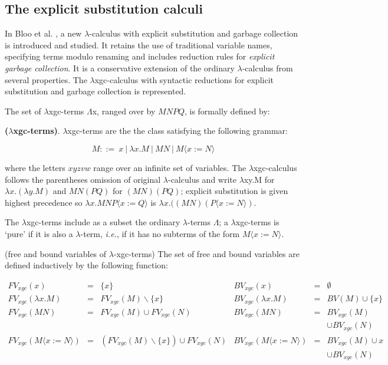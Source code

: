 \subsection{The explicit substitution calculi}

In Bloo et al. \cite{bloo1995preservation}, a new $\lambda$-calculus with explicit substitution and garbage collection is introduced and studied. It retains the use of traditional variable names, specifying terms modulo renaming and includes reduction rules for \textit{explicit garbage collection}. It is a conservative extension of the ordinary $\lambda$-calculus from several properties. The $\lambda$xgc-calculus with syntactic reductions for explicit substitution and garbage collection is represented.    

\noindent The set of $\lambda$xgc-terms $\Lambda$x, ranged over by $MNPQ$, is formally defined by: 
\begin{def1}
\normalfont \textbf{($\lambda$xgc-terms)}. $\lambda$xgc-terms are the the class satisfying the following grammar: 
\end{def1}
\begin{equation*}
M ::= \ x\ |\ \lambda x.M\ |\ MN\ |\ M\langle x:=N\rangle
\end{equation*}

where the letters $xyzvw$ range over an infinite set of variables. The $\lambda$xgc-calculus follows the parentheses omission of original $\lambda$-calculus and write $\lambda$xy.M for $\lambda x.(\lambda y.M)$ and $MN(PQ)$ for $(MN)(PQ)$; explicit substitution is given highest precedence so $\lambda x.MNP\langle x:=Q\rangle $ is $\lambda x.((MN)(P\langle x:=N\rangle )$.

The $\lambda$xgc-terms include as a subset the ordinary $\lambda$-terms $\Lambda$; a $\lambda$xgc-terms is `pure' if it is also a $\lambda$-term, \textit{i.e.}, if it has no subterms of the form $M\langle x:=N\rangle$.

\begin{def1}
\normalfont (free and bound variables of $\lambda$-xgc-terms) The set of free and bound variables are defined inductively by the following function:
\end{def1}
\begin{equation*}\label{eq:fvxgc}
\begin{array}{lcllcl}
FV_{xgc}(x)           & = & \{x\}             & BV_{xgc}(x)           &=& \emptyset\\
FV_{xgc}(\lambda x.M) & = & FV_{xgc}(M)\backslash \{x\} & BV_{xgc}(\lambda x.M) &=& BV(M)\cup \{x\}\\
FV_{xgc}(MN)          & = & FV_{xgc}(M)\cup FV_{xgc}(N) & BV_{xgc}(MN)          &=& BV_{xgc}(M) \\ 
                        &&&&&\cup BV_{xgc}(N)\\
FV_{xgc}(M\langle x:=N\rangle)          & = & (FV_{xgc}(M)\backslash \{x\})\cup FV_{xgc}(N) & BV_{xgc}(M\langle x:=N\rangle)    &=& BV_{xgc}(M)\cup {x} \\
                                   &&&&&\cup BV_{xgc}(N)
\end{array}
\end{equation*}

